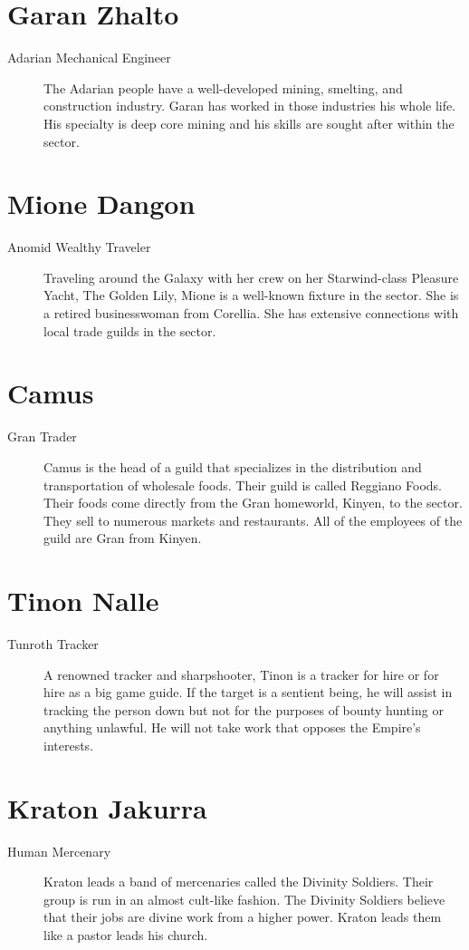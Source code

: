 \documentclass{article}
\begin{document}
\section{Garan Zhalto}
\begin{description}
	\item [Adarian \male Mechanical Engineer] The Adarian people have a well-developed mining, smelting, and construction industry. Garan has worked in those industries his whole life. His specialty is deep core mining and his skills are sought after within the sector.
\end{description}
\section{Mione Dangon}
\begin{description}
	\item [Anomid \female Wealthy Traveler] Traveling around the Galaxy with her crew on her Starwind-class Pleasure Yacht, The Golden Lily, Mione is a well-known fixture in the sector. She is a retired businesswoman from Corellia. She has extensive connections with local trade guilds in the sector.
\end{description}
\section{Camus}
\begin{description}
	\item [Gran \male Trader] Camus is the head of a guild that specializes in the distribution and transportation of wholesale foods. Their guild is called Reggiano Foods. Their foods come directly from the Gran homeworld, Kinyen, to the sector. They sell to numerous markets and restaurants. All of the employees of the guild are Gran from Kinyen.
\end{description}
\section{Tinon Nalle}
\begin{description}
	\item [Tunroth \male Tracker] A renowned tracker and sharpshooter, Tinon is a tracker for hire or for hire as a big game guide. If the target is a sentient being, he will assist in tracking the person down but not for the purposes of bounty hunting or anything unlawful. He will not take work that opposes the Empire’s interests.
\end{description}
\section{Kraton Jakurra}
\begin{description}
	\item [Human \male Mercenary] Kraton leads a band of mercenaries called the Divinity Soldiers. Their group is run in an almost cult-like fashion. The Divinity Soldiers believe that their jobs are divine work from a higher power. Kraton leads them like a pastor leads his church.
\end{description}
\end{document}
